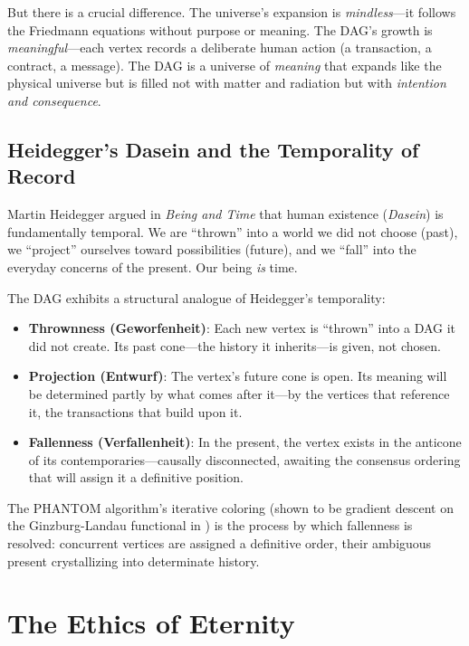\documentclass[12pt,a4paper]{article}
\theoremstyle{philosophical}
\begin{document}
But there is a crucial difference. The universe's expansion is \emph{mindless}---it follows the Friedmann equations without purpose or meaning. The DAG's growth is \emph{meaningful}---each vertex records a deliberate human action (a transaction, a contract, a message). The DAG is a universe of \emph{meaning} that expands like the physical universe but is filled not with matter and radiation but with \emph{intention and consequence}.

\subsection{Heidegger's Dasein and the Temporality of Record}

Martin Heidegger argued in \emph{Being and Time} that human existence (\emph{Dasein}) is fundamentally temporal. We are ``thrown'' into a world we did not choose (past), we ``project'' ourselves toward possibilities (future), and we ``fall'' into the everyday concerns of the present. Our being \emph{is} time.

The DAG exhibits a structural analogue of Heidegger's temporality:

\begin{itemize}[leftmargin=*]
\item \textbf{Thrownness (Geworfenheit)}: Each new vertex is ``thrown'' into a DAG it did not create. Its past cone---the history it inherits---is given, not chosen.

\item \textbf{Projection (Entwurf)}: The vertex's future cone is open. Its meaning will be determined partly by what comes after it---by the vertices that reference it, the transactions that build upon it.

\item \textbf{Fallenness (Verfallenheit)}: In the present, the vertex exists in the anticone of its contemporaries---causally disconnected, awaiting the consensus ordering that will assign it a definitive position.
\end{itemize}

The PHANTOM algorithm's iterative coloring (shown to be gradient descent on the Ginzburg-Landau functional in \cite{qnk-physics}) is the process by which fallenness is resolved: concurrent vertices are assigned a definitive order, their ambiguous present crystallizing into determinate history.

\section{The Ethics of Eternity}
\end{document}
